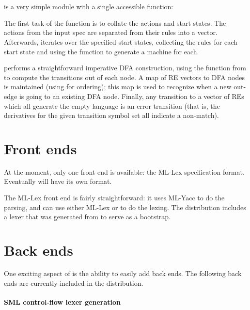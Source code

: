 \section{}\label{sec:lex-gen}

 is a very simple module with a single accessible function:
\begin{center}
\end{center}

The first task of the  function is to collate the actions and start
states.  The actions from the input spec are separated from their rules into a
vector.  Afterwards,  iterates over the specified start states,
collecting the rules for each start state and using the  function to
generate a machine for each.

 performs a straightforward imperative DFA construction, using
the  function from  to compute the transitions out of
each node. A map of RE vectors to DFA nodes is maintained (using
 for ordering); this map is used to recognize
when a new out-edge is going to an existing DFA node.  Finally, any transition
to a vector of REs which all generate the empty language is an error transition
(that is, the derivatives for the given transition symbol set all indicate a
non-match).

\section{Front ends}

At the moment, only one front end is available: the ML-Lex specification
format.  Eventually \ulex{} will have its own format.

The ML-Lex front end is fairly straightforward: it uses ML-Yacc to do the
parsing, and can use either ML-Lex or \ulex{} to do the lexing.  The
distribution includes a lexer that was generated from \ulex{} to serve as a
bootstrap.

\section{Back ends}

One exciting aspect of \ulex{} is the ability to easily add back ends.  The
following back ends are currently included in the distribution.

\paragraph{SML control-flow lexer generation}

